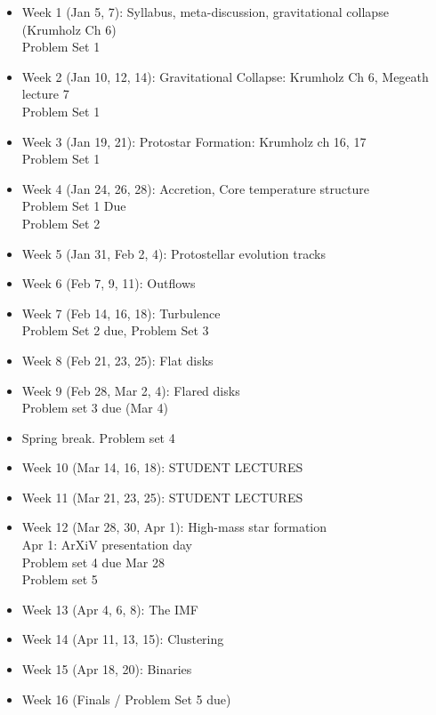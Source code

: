 \documentclass[11pt]{article}
\begin{document}
\begin{itemize}
    \item Week 1 (Jan 5, 7): Syllabus, meta-discussion, gravitational collapse (Krumholz Ch 6) \\
        Problem Set 1
    \item Week 2 (Jan 10, 12, 14): Gravitational Collapse: Krumholz Ch 6, Megeath lecture 7 \\
        Problem Set 1
    \item Week 3 (Jan 19, 21): Protostar Formation: Krumholz ch 16, 17 \\
        Problem Set 1
    \item Week 4 (Jan 24, 26, 28):  Accretion, Core temperature structure \\
        Problem Set 1 Due \\
        Problem Set 2
    \item Week 5 (Jan 31, Feb 2, 4): Protostellar evolution tracks \\
    \item Week 6 (Feb 7, 9, 11): Outflows \\
    \item Week 7 (Feb 14, 16, 18): Turbulence \\
        Problem Set 2 due, Problem Set 3
    \item Week 8 (Feb 21, 23, 25): Flat disks \\
    \item Week 9 (Feb 28, Mar 2, 4): Flared disks \\
        Problem set 3 due (Mar 4)
    \item Spring break.
        Problem set 4 
    \item Week 10 (Mar 14, 16, 18): STUDENT LECTURES \\
    \item Week 11 (Mar 21, 23, 25): STUDENT LECTURES \\
    \item Week 12 (Mar 28, 30, Apr 1):  High-mass star formation \\
        Apr 1: ArXiV presentation day \\
        Problem set 4 due Mar 28 \\
        Problem set 5 \\
    \item Week 13 (Apr 4, 6, 8): The IMF \\
    \item Week 14 (Apr 11, 13, 15): Clustering \\
    \item Week 15 (Apr 18, 20):  Binaries\\
    \item Week 16 (Finals / Problem Set 5 due)
\end{itemize}
\end{document}
